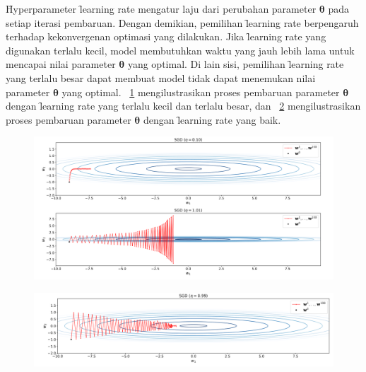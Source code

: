     \f{Hyperparameter} \f{learning rate} mengatur laju dari perubahan parameter $\bm{\theta}$ pada setiap iterasi pembaruan. Dengan demikian, pemilihan \f{learning rate} berpengaruh terhadap kekonvergenan optimasi yang dilakukan. Jika \f{learning rate} yang digunakan terlalu kecil, model membutuhkan waktu yang jauh lebih lama untuk mencapai nilai parameter $\bm{\theta}$ yang optimal. Di lain sisi, pemilihan \f{learning rate} yang terlalu besar dapat membuat model tidak dapat menemukan nilai parameter $\bm{\theta}$ yang optimal. \pic~\ref{fig:learning-rate-bad} mengilustrasikan proses pembaruan parameter $\bm{\theta}$ dengan \f{learning rate} yang terlalu kecil dan terlalu besar, dan \pic~\ref{fig:learning-rate-good} mengilustrasikan proses pembaruan parameter $\bm{\theta}$ dengan \f{learning rate} yang baik.
\begin{figure}[!ht]
    \centering
    \includegraphics[width=1\textwidth]{assets/pics/learning-rate-bad.png}
    \label{fig:learning-rate-bad}
\end{figure}

\begin{figure}[!ht]
    \centering
    \includegraphics[width=1\textwidth]{assets/pics/learning-rate-good.png}
    \label{fig:learning-rate-good}
\end{figure}

